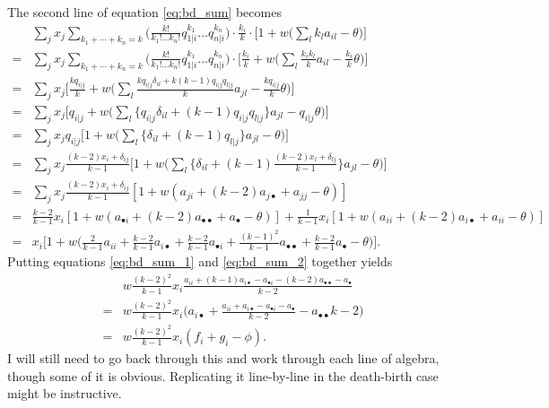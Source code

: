 \documentclass[14pt, justified]{tufte-handout}
\begin{document}
The second line of equation \ref{eq:bd_sum} becomes
\begin{equation}
    \begin{split}
        & \sum_j x_j \sum_{k_1 + \cdots + k_n = k} \Big( \frac{k!}{k_1! \ldots k_n!} q_{1|i}^{k_1} \ldots q_{n|i}^{k_n} \Big) \cdot \frac{k_i}{k} \cdot \Big[ 1 + w \Big( \sum_l k_l a_{il} - \theta \Big) \Big]
        \\
        = & \sum_j x_j \sum_{k_1 + \cdots + k_n = k} \Big( \frac{k!}{k_1! \ldots k_n!} q_{1|i}^{k_1} \ldots q_{n|i}^{k_n} \Big) \cdot \Big[ \frac{k_i}{k} + w \Big( \sum_l \frac{k_i k_l}{k} a_{il} - \frac{k_i}{k}\theta \Big) \Big]
        \\
        = & \sum_j x_j \Big[ \frac{kq_{i|j}}{k} + w \Big( \sum_l \frac{k q_{i|j} \delta_{il} + k(k-1) q_{i|j} q_{l|j}}{k}a_{jl} - \frac{kq_{i|j}}{k}\theta \Big) \Big]
        \\
        = & \sum_j x_j \Big[ q_{i|j} + w \Big( \sum_l \{ q_{i|j} \delta_{il} + (k-1) q_{i|j} q_{l|j} \} a_{jl} - q_{i|j} \theta \Big) \Big]
        \\
        = & \sum_j x_j q_{i|j} \Big[ 1 + w \Big( \sum_l \{ \delta_{il} + (k-1) q_{l|j} \} a_{jl} - \theta \Big) \Big]
        \\
        = & \sum_j x_j \frac{(k-2)x_i + \delta_{ij}}{k-1} \Big[ 1 + w \Big( \sum_l \Big\{ \delta_{il} + (k-1) \frac{(k-2)x_l +\delta_{lj}}{k-1} \Big\} a_{jl} - \theta \Big) \Big]
        \\
        = & \sum_j x_j \frac{(k-2)x_i + \delta_{ij}}{k-1} [ 1 + w(a_{ji} + (k-2) a_{j \bullet} + a_{jj} - \theta )]
        \\
        = & \frac{k-2}{k-1} x_i [ 1 + w(a_{\bullet i} + (k-2) a_{\bullet \bullet} + a_{\bullet} - \theta )]
        + \frac{1}{k-1} x_i [ 1 + w(a_{ii} + (k-2) a_{i \bullet} + a_{ii} - \theta )]
        \\
        = & x_i \Big[ 1 + w \Big( \frac{2}{k-1} a_{ii} + \frac{k-2}{k-1} a_{i \bullet} + \frac{k-2}{k-1} a_{\bullet i} + \frac{(k-1)^2}{k-1} a_{\bullet \bullet} + \frac{k-2}{k-1} a_{\bullet} - \theta \Big) \Big].
    \end{split}
    \label{eq:bd_sum_2}
\end{equation}
Putting equations \ref{eq:bd_sum_1} and \ref{eq:bd_sum_2} together yields
\begin{equation}
    \begin{split}
        & w \frac{(k-2)^2}{k-1} x_i \frac{a_{ii} + (k-1) a_{i \bullet} - a_{\bullet i} - (k-2) a_{\bullet \bullet} - a_{\bullet}}{k-2}
        \\
        = & w \frac{(k-2)^2}{k-1} x_i \Big( a_{i \bullet} + \frac{a_{ii} + a_{i \bullet} - a_{\bullet i} - a_{\bullet}}{k-2} - a_{\bullet \bullet}{k-2} \Big)
        \\
        = & w \frac{(k-2)^2}{k-1} x_i (f_i + g_i - \phi).
    \end{split}
\end{equation}
I will still need to go back through this and work through each line of algebra, though some of it is obvious.
Replicating it line-by-line in the death-birth case might be instructive.
\end{document}
